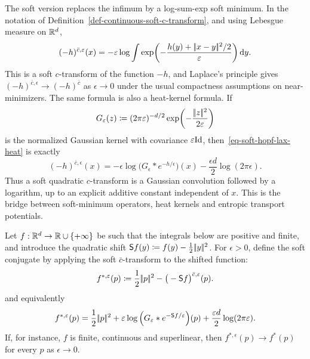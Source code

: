 The soft version replaces the infimum by a log-sum-exp soft minimum. In the notation of Definition~\ref{def-continuous-soft-c-transform}, and using Lebesgue measure on $\mathbb{R}^d$,
\begin{equation}\label{eq-soft-hopf-lax-heat}
	(-h)^{\bar c,\varepsilon}(x)
	=
	-\varepsilon\log
	\int
	\exp\!\left(
	-\frac{h(y)+|\!| x-y |\!|^2/2}{\varepsilon}
	\right)\mathrm{d} y.
	\end{equation}
This is a soft $c$-transform of the function $-h$, and Laplace's principle gives $(-h)^{\bar c,\epsilon}\to(-h)^{\bar c}$ as $\epsilon\to0$ under the usual compactness assumptions on near-minimizers. The same formula is also a heat-kernel formula. If
\[
	G_\varepsilon(z)\coloneqq (2\pi\varepsilon)^{-d/2}\exp\!\left(-\frac{|\!| z |\!|^2}{2\varepsilon}\right)
\]
is the normalized Gaussian kernel with covariance $\varepsilon\mathrm{Id}$, then~\eqref{eq-soft-hopf-lax-heat} is exactly
\begin{equation}\label{eq-soft-c-transform-gaussian-convolution}
	(-h)^{\bar c,\epsilon}(x)
	=
	-\epsilon\log\Big(G_\epsilon\ast e^{-h/\epsilon}\Big)(x)
	-\frac{\epsilon d}{2}\log(2\pi\epsilon).
\end{equation}
Thus a soft quadratic $c$-transform is a Gaussian convolution followed by a logarithm, up to an explicit additive constant independent of $x$. This is the bridge between soft-minimum operators, heat kernels and entropic transport potentials.

\begin{prop}\label{prop-soft-legendre-convolution}
Let $f:\mathbb{R}^d\to\mathbb{R}\cup\{+\infty\}$ be such that the integrals below are positive and finite, and introduce the quadratic shift $\mathsf S f(y)\coloneqq f(y)-\frac12|\!| y |\!|^2$.
For $\epsilon>0$, define the soft conjugate by applying the soft $\bar c$-transform to the shifted function:
\begin{equation}\label{eq-soft-legendre-definition}
	f^{*,\varepsilon}(p)
	\coloneqq
	\frac12|\!| p |\!|^2-\big(-\mathsf S f\big)^{\bar c,\varepsilon}(p).
\end{equation}
and equivalently
\begin{equation}\label{eq-soft-legendre-convolution}
	f^{*,\varepsilon}(p)
	=
	\frac12|\!| p |\!|^2
	+\varepsilon\log\Big(G_\varepsilon\ast e^{-\mathsf S f/\varepsilon}\Big)(p)
	+\frac{\varepsilon d}{2}\log(2\pi\varepsilon).
\end{equation}
If, for instance, $f$ is finite, continuous and superlinear, then $f^{*,\epsilon}(p)\to f^*(p)$ for every $p$ as $\epsilon\to0$.
\end{prop}

